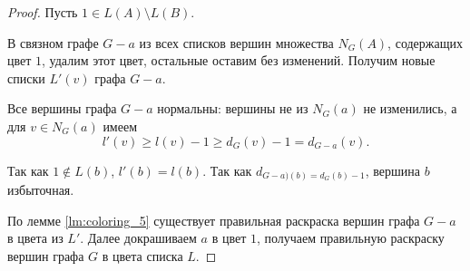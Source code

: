 \begin{proof}
    Пусть $1 \in L(A) \setminus L(B)$.

	В связном графе $G-a$ из всех списков вершин множества $N_{G}(A)$, содержащих цвет $1$, удалим этот цвет, остальные оставим без изменений. Получим новые списки $L'(v)$ графа $G-a$.

	Все вершины графа $G-a$ нормальны: вершины не из $N_G(a)$ не изменились, а для $v \in N_G(a)$ имеем
	\[
	l'(v) \ge l(v) - 1 \ge d_G(v) - 1 = d_{G-a}(v)
	.\] 

	Так как $1 \notin L(b)$, $l'(b) = l(b)$. Так как $d_{G-a)(b) = d_G(b)-1}$, вершина $b$ избыточная.

	По лемме \ref{lm:coloring_5} существует правильная раскраска вершин графа $G-a$ в цвета из $L'$. Далее докрашиваем $a$ в цвет $1$, получаем правильную раскраску вершин графа $G$ в цвета списка $L$.
\end{proof}

